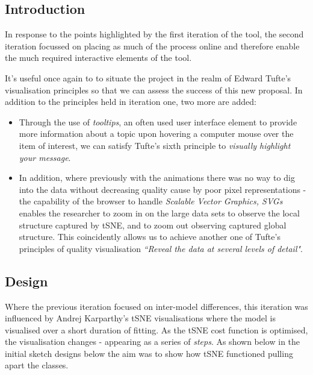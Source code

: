 \documentclass[a4paper,11pt,titlepage]{article}
\begin{document}
	\subsection{Introduction}
	In response to the points highlighted by the first iteration of the tool, the second iteration focussed on placing as much of the process online and therefore enable the much required interactive elements of the tool.	
	\par 
	It's useful once again to to situate the project in the realm of Edward Tufte's visualisation principles so that we can assess the success of this new proposal. In addition to the principles held in iteration one, two more are added:
	\begin{itemize}
		\item Through the use of \textit{tooltips}, an often used user interface element to provide more information about a topic upon hovering a computer mouse over the item of interest, we can satisfy Tufte's sixth principle to \textit{visually highlight your message}. 
		\item In addition, where previously with the animations there was no way to dig into the data without decreasing quality cause by poor pixel representations - the capability of the browser to handle \textit{Scalable Vector Graphics, SVGs} enables the researcher to zoom in on the large data sets to observe the local structure captured by tSNE, and to zoom out observing captured global structure. This coincidently allows us to achieve another one of Tufte's principles of quality visualisation  \textit{``Reveal the data at several levels of detail"}. 
	\end{itemize}
	
	\subsection{Design}
	Where the previous iteration focused on inter-model differences, this iteration was influenced by Andrej Karparthy's tSNE visualisations where the model is visualised over a short duration of fitting. As the tSNE cost function is optimised, the visualisation changes - appearing as a series of \textit{steps}. As shown below in the initial sketch designs below the aim was to show how tSNE functioned pulling apart the classes.
		
\end{document}
